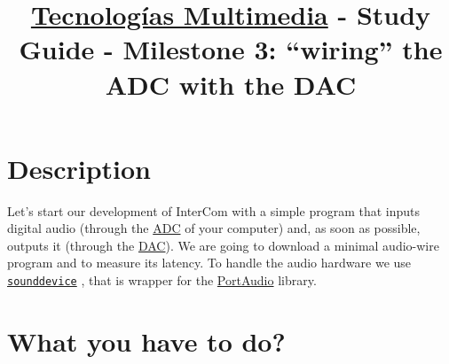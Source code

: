 \title{\href{https://www.ual.es/estudios/grados/presentacion/plandeestudios/asignatura/4015/40154321?idioma=zh_CN}{Tecnologías Multimedia} - Study Guide - Milestone 3: ``wiring'' the ADC with the DAC}

\maketitle

\section{Description}

Let's start our development of InterCom with a simple program that
inputs digital audio (through the
\href{https://en.wikipedia.org/wiki/Analog-to-digital_converter}{ADC}
of your computer) and, as soon as possible, outputs it (through the
\href{https://en.wikipedia.org/wiki/Digital-to-analog_converter}{DAC}). We
are going to download a minimal audio-wire program and to measure its
latency. To handle the audio hardware we use
\href{https://python-sounddevice.readthedocs.io}{\texttt{sounddevice}}
\cite{sounddevice}, that is wrapper for the
\href{http://www.portaudio.com/}{PortAudio} library.

\section{What you have to do?}

